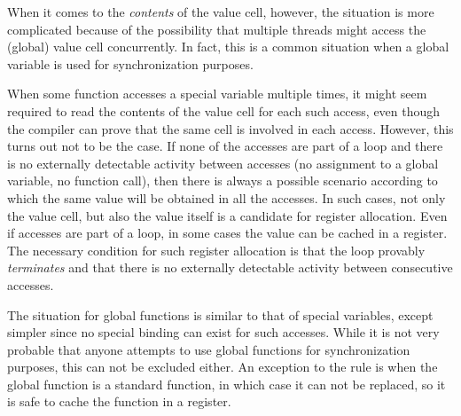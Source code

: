 When it comes to the \emph{contents} of the value cell, however, the
situation is more complicated because of the possibility that multiple
threads might access the (global) value cell concurrently.  In fact,
this is a common situation when a global variable is used for
synchronization purposes.

When some function accesses a special variable multiple times, it
might seem required to read the contents of the value cell for each
such access, even though the compiler can prove that the same cell is
involved in each access.  However, this turns out not to be the case.
If none of the accesses are part of a loop and there is no externally
detectable activity between accesses (no assignment to a global
variable, no function call), then there is always a possible scenario
according to which the same value will be obtained in all the
accesses.  In such cases, not only the value cell, but also the value
itself is a candidate for register allocation.  Even if accesses are
part of a loop, in some cases the value can be cached in a register.
The necessary condition for such register allocation is that the loop
provably \emph{terminates} and that there is no externally detectable
activity between consecutive accesses.

The situation for global functions is similar to that of special
variables, except simpler since no special binding can exist for such
accesses.  While it is not very probable that anyone attempts to use
global functions for synchronization purposes, this can not be
excluded either.  An exception to the rule is when the global function
is a standard \commonlisp{} function, in which case it can not be replaced, so
it is safe to cache the function in a register.

